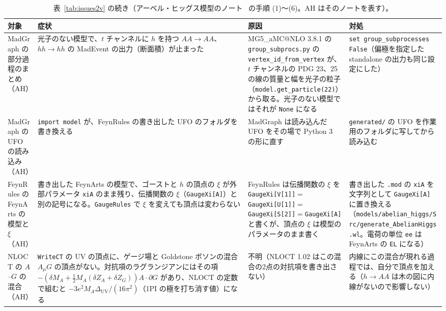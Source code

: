 \documentclass[a4paper,10pt]{ltjsarticle}
\makeatletter
\newcommand{\MGaMC}{MG5\_aMC@NLO}
\makeatother
\begin{document}
\begin{table}[tbp]
\centering\footnotesize
\caption{表~\ref{tab:issues2v} の続き（アーベル・ヒッグス模型のノート~\cite{ahnote} の手順 (1)〜(6)。AH はそのノートを表す）。}
\label{tab:issues2w}
\begin{tabularx}{\linewidth}{>{\raggedright\arraybackslash}p{2.4cm}>{\raggedright\arraybackslash}X>{\raggedright\arraybackslash}X>{\raggedright\arraybackslash}X}
\toprule
\textbf{対象} & \textbf{症状} & \textbf{原因} & \textbf{対処} \\
\midrule
MadGraph の部分過程のまとめ（AH） & 光子のない模型で、$t$ チャンネルに $h$ を持つ $AA\to AA$、$hh\to hh$ の MadEvent の出力（断面積）が止まった & \MGaMC{} 3.8.1 の \texttt{group\_subprocs.py} の \texttt{vertex\_id\_from\_vertex} が、$t$ チャンネルの PDG 23、25 の線の質量と幅を光子の粒子（\texttt{model.get\_particle(22)}）から取る。光子のない模型ではそれが \texttt{None} になる & \texttt{set group\_subprocesses False}（偏極を指定した standalone の出力も同じ設定にした） \\
MadGraph の UFO の読み込み（AH） & \texttt{import model} が、FeynRules の書き出した UFO のフォルダを書き換える & MadGraph は読み込んだ UFO をその場で Python 3 の形に直す & \nolinkurl{generated/} の UFO を作業用のフォルダに写してから読み込む \\
FeynRules の FeynArts の模型と $\xi$（AH） & 書き出した FeynArts の模型で、ゴーストと $h$ の頂点の $\xi$ が外部パラメータ \texttt{xiA} のまま残り、伝播関数の $\xi$（\texttt{GaugeXi[A]}）と別の記号になる。\texttt{GaugeRules} で $\xi$ を変えても頂点は変わらない & FeynRules は伝播関数の $\xi$ を \texttt{GaugeXi[V[1]]}${}={}$\allowbreak\texttt{GaugeXi[U[1]]}${}={}$\allowbreak\texttt{GaugeXi[S[2]]}${}={}$\allowbreak\texttt{GaugeXi[A]} と書くが、頂点の $\xi$ は模型のパラメータのまま書く & 書き出した \texttt{.mod} の \texttt{xiA} を文字列として \texttt{GaugeXi[A]} に置き換える（\nolinkurl{models/abelian_higgs/Src/generate_AbelianHiggs.wl}。電荷の単位 \texttt{ee} は FeynArts の \texttt{EL} になる） \\
NLOCT の $A$--$G$ の混合（AH） & \texttt{WriteCT} の UV の頂点に、ゲージ場と Goldstone ボソンの混合 $A_\mu G$ の頂点がない。対抗項のラグランジアンにはその項 $-(\delta M_A+\frac12M_A(\delta Z_A+\delta Z_G))A\cdot\partial G$ があり、NLOCT の定数で組むと $-3e^2M_A\Delta_{\mathrm{UV}}/(16\pi^2)$（1PI の極を打ち消す値）になる & 不明（NLOCT 1.02 はこの混合の2点の対抗項を書き出さない） & 内線にこの混合が現れる過程では、自分で頂点を加える（$h\to AA$ は木の図に内線がないので影響しない） \\

\end{tabularx}
\end{table}
\end{document}
